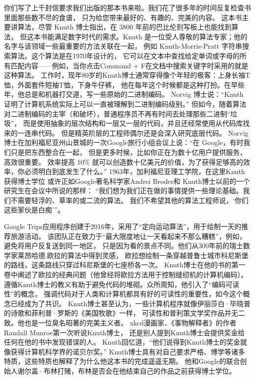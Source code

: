 \documentclass[12pt]{ctexart}
\begin{document}
\begin{multicols}{2}
你们写了上千封信要求我们出版的那本书来啦。我们花了很多年的时间反复检查书里面那些数不尽的食谱，
只为给您带来最好的、有趣的、完美的内容。
这本书主要讲算法，尽管 Knuth 博士指出，在 3800 年前的巴比伦刻写板上也能找到算法，
但这本书能满足数字时代的需求。Knuth 是一位受人尊敬的算法专家；他的名字与该领域一些最重要的方法关联在一起，
例如 Knuth-Morris-Pratt 字符串搜索算法。这个算法是在1970年设计的，
它可以在文本中查找给定单词或字母的所有匹配内容——例如，当你点击Command + F在文档中搜索关键字时采用的就是这种算法。
工作时，现年80岁的Knuth博士通常穿得像个年轻的极客：上身长袖T恤，外面套件短袖T恤，下身牛仔裤，
他在每年这个时候都是这种打扮。在早些年，他总是和机器打交道，写一些原始的二进制编码。
Norvig 博士说：“Knuth 证明了计算机系统实际上可以一直被理解到二进制编码级别。”
但如今，随着算法对二进制编码的主宰（和破坏），普通程序员不再有时间去处理那些二进制“垃圾”，
而是使用抽象的层次结构和一层又一层的代码，并且还经常使用从代码库找来的一连串代码。
但是精英阶层的工程师偶尔还是会深入研究底层代码。   
Norvig 博士在加利福尼亚州山景城的一次Google旅行小组会议上说：“在 Google，有时我们只是把东西整合在一起，
但是更多时候，比如你正在为数十亿用户提供服务，高效很重要。
效率提高 10\% 就可以创造数十亿美元的价值，为了获得足够高的效率，你必须明白到底发生了什么。”       
1963年，加利福尼亚理工学院，在这里Knuth获得博士学位
或许正如Google著名科学家Andrei Broder和 Knuth博士以前的一个研究生在会议中所说的那样：
“我们想为我们正在做的事情提供一些理论基础。我们不需要轻浮的、草率的或二流的算法。
我们不希望其他的算法工程师说，‘你们这些家伙是白痴’”。

Google Trips应用程序创建于2016年，采用了“定向运动算法”，用于绘制一天的推荐旅游活动。
该团队正在致力于“最大限度地让一天看起来不那么糟糕”，例如，避免将用户反复送到同一地区，
只是因为看的景点不同。他们从300年前的瑞士数学家莱昂哈德.欧拉的算法中得到灵感，
欧拉想绘制一条穿越普鲁士城市科尼斯堡的路线，这条路线只穿过科尼斯堡的七座桥各一次。
Knuth博士在他的书的第一卷中阐述了欧拉的经典问题（他曾经将欧拉方法用于控制缝纫机的计算机编码）。
遵循Knuth博士的教义有助于避免代码的堆砌。众所周知，他引入了“编码可读性”的概念，
强调代码对于人类和计算机都具有好的可读性的重要性，如今这个概念已经成为了共识。
Knuth博士甚至认为，一些计算机程序就像伊丽莎白·毕晓普的诗歌和菲利普·罗斯的《美国牧歌》一样，
可读性和普利策文学奖作品并无二致。他也是一位臭名昭著的完美主义者。
xkcd漫画家、《事物解释者》的作者Randall Munroe第一次听说Knuth博士，
还是别人提到Knuth博士会提供奖金给任何在他的书中发现错误的人。
Knuth回忆道，“他们说得到Knuth博士的奖金就像获得计算机科学界的诺贝尔奖。”
Knuth博士具有对自己要求严格、博学等诸多特质，这些特质也解释了为什么他这本书的完成遥遥无期。
他和Google的联合创始人谢尔盖·布林打赌，布林是否会在他结束自己的作品之前获得博士学位。


\end{multicols}
\end{document}
